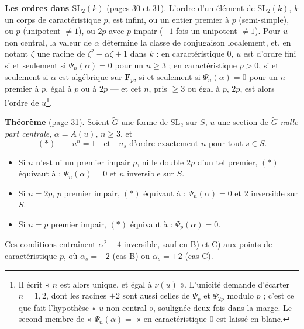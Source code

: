 \documentclass[11pt,a4paper]{article}
\begin{document}
\textbf{Les ordres dans $\mathrm{SL}_2(k)$} (pages 30 et 31). L'ordre d'un
élément de $\mathrm{SL}_2(k)$, $k$ un corps de caractéristique $p$, est infini,
ou un entier premier à $p$ (semi-simple), ou $p$ (unipotent $\neq 1$), ou
$2p$ avec $p$ impair ($-1$ fois un unipotent $\neq 1$). Pour $u$ non central,
la valeur de $\alpha$ détermine la classe de conjugaison localement, et, en
notant $\zeta$ une racine de $\zeta^2 - \alpha\zeta + 1$ dans $\bar k$ : en
caractéristique $0$, $u$ est d'ordre fini si et seulement si $\Psi_n(\alpha) =
0$ pour un $n \geq 3$ ; en caractéristique $p > 0$, si et seulement si $\alpha$
est algébrique sur $\mathbf{F}_p$, si et seulement si $\Psi_n(\alpha) = 0$ pour
un $n$ premier à $p$, égal à $p$ ou à $2p$ --- et cet $n$, pris $\geq 3$ ou
égal à $p$, $2p$, est alors l'ordre de $u$\footnote{Il écrit « $n$ est alors
unique, et égal à $\nu(u)$ ». L'unicité demande d'écarter $n = 1, 2$, dont les
racines $\pm 2$ sont aussi celles de $\Psi_p$ et $\Psi_{2p}$ modulo $p$ ; c'est
ce que fait l'hypothèse « $u$ non central », soulignée deux fois dans la
marge. Le second membre de « $\Psi_n(\alpha) = $ » en caractéristique $0$ est
laissé en blanc.}.

\textbf{Théorème} (page 31). Soient $\widetilde{G}$ une forme de
$\mathrm{SL}_2$ sur $S$, $u$ une section de $\widetilde{G}$ \emph{nulle part
centrale}, $\alpha = A(u)$, $n \geq 3$, et
\[
  (*) \qquad u^n = 1 \quad \text{et} \quad u_s \text{ d'ordre exactement } n
  \text{ pour tout } s \in S .
\]
\begin{itemize}
  \item[A)] Si $n$ n'est ni un premier impair $p$, ni le double $2p$ d'un tel
    premier, $(*)$ équivaut à : $\Psi_n(\alpha) = 0$ et $n$ inversible sur $S$.
  \item[B)] Si $n = 2p$, $p$ premier impair, $(*)$ équivaut à :
    $\Psi_n(\alpha) = 0$ et $2$ inversible sur $S$.
  \item[C)] Si $n = p$ premier impair, $(*)$ équivaut à : $\Psi_p(\alpha) = 0$.
\end{itemize}
Ces conditions entraînent $\alpha^2 - 4$ inversible, sauf en B) et C) aux
points de caractéristique $p$, où $\alpha_s = -2$ (cas B) ou $\alpha_s = +2$
(cas C).
\end{document}
